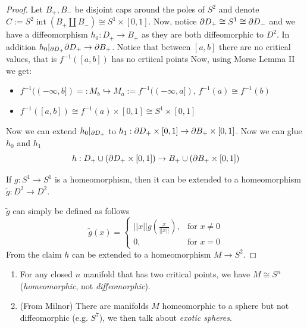 \begin{proof}
    \noindent Let $B_+, B_-$ be disjoint caps around the poles of $S^2$ and denote $C := S^2 \operatorname{int} (B_+ \amalg B_-) \cong S^1 \times [0,1]$. %
    Now, notice $\partial D_+ \cong S^1 \cong \partial D_-$ and we have a diffeomorphism $h_0: D_+ \to B_+$ as they are both diffeomorphic to $D^2$. In addition $h_0 |_{\partial D_+} \partial D_+ \to \partial B_+$.
    Notice that between $[a,b]$ there are no critical values, that is $f^{-1}([a,b])$ has no crtiical points
    Now, using Morse Lemma II we get:
    \begin{itemize}
        \item $f^{-1}((-\infty, b]) =: M_b \hookrightarrow M_a :=f^{-1}((-\infty, a])$, $f^{-1}(a) \cong f^{-1}(b)$
        \item $f^{-1}([a,b]) \cong f^{-1}(a) \times [0,1] \cong S^1 \times [0,1] $%
    \end{itemize}
    Now we can extend $h_0|_{\partial D_+}$ to $h_1: \partial D_+ \times [0,1] \to \partial B_+ \times [0,1]$. Now we can glue $h_0$ and $h_1$
    \begin{equation}
        h: D_+ \cup (\de D_+ \times [0,1]) \to B_+ \cup (\de B_+ \times [0,1]) %
    \end{equation}
    \begin{clm}
        If $g: S^1 \to S^1$ is a homeomorphism, then it can be extended to a homeomorphism $\tilde g: D^2 \to D^2$.
    \end{clm}
    \noindent $\tilde g$ can simply be defined as follows
    \begin{equation}
        \tilde g(x) = 
        \begin{cases}
            ||x|| g\left(\frac{x}{||x||}\right), & \text{for } x\neq 0\\
            0, & \text{for } x=0
        \end{cases}
    \end{equation}
    From the claim $h$ can be extended to a homeomorphism $M \to S^2$.
\end{proof}

\begin{rem}
\hfill
    \begin{enumerate}
        \item For any closed $n$ manifold that has two critical points, we have $M \cong S^n$ (\textit{homeomorphic}, not \textit{diffeomorphic}).
        \item (From Milnor) There are manifolds $M$ homeomorphic to a sphere but not diffeomorphic (e.g. $S^7$), we then talk about \textit{exotic spheres}.
    \end{enumerate}
\end{rem}

